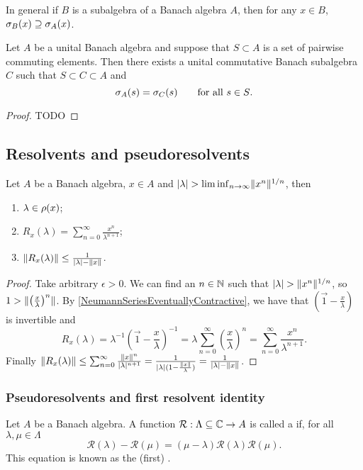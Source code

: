 In general if $B$ is a subalgebra of a Banach algebra $A$, then for any $x\in B$, $\sigma_B(x) \supseteq \sigma_A(x)$.

\begin{proposition}
Let $A$ be a unital Banach algebra and suppose that $S\subset A$ is a set of pairwise commuting elements. Then there exists a unital commutative Banach subalgebra $C$ such that $S\subset C\subset A$ and
\[ \sigma_A(s) = \sigma_C(s) \qquad \text{for all $s\in S$.} \]
\end{proposition}
\begin{proof}
TODO
\end{proof}


\subsection{Resolvents and pseudoresolvents}

\begin{proposition} \label{secondNeumannSeries}
Let $A$ be a Banach algebra, $x\in A$ and $|\lambda| > \liminf_{n\to \infty}\lVert x^n\rVert^{1/n}$, then
\begin{enumerate}
\item $\lambda\in\rho(x)$;
\item $R_x(\lambda) = \sum_{n=0}^\infty\frac{x^n}{\lambda^{n+1}}$;
\item $\lVert R_x(\lambda)\rVert \leq \frac{1}{|\lambda|-\lVert x\rVert}$.
\end{enumerate}
\end{proposition}
\begin{proof}
Take arbitrary $\epsilon > 0$. We can find an $n\in\mathbb{N}$ such that $|\lambda| > \lVert x^n\rVert^{1/n}$, so $1 > \lVert\left(\frac{x}{\lambda}\right)^n\rVert$. By \ref{NeumannSeriesEventuallyContractive}, we have that $(\vec{1} - \frac{x}{\lambda})$ is invertible and
\[ R_x(\lambda) = \lambda^{-1} \left(\vec{1} - \frac{x}{\lambda}\right)^{-1} = \lambda \sum_{n=0}^\infty\left(\frac{x}{\lambda}\right)^n = \sum_{n=0}^\infty\frac{x^n}{\lambda^{n+1}}. \]
Finally $\lVert R_x(\lambda)\rVert \leq \sum_{n=0}^\infty\frac{\lVert x\rVert^n}{|\lambda|^{n+1}} = \frac{1}{|\lambda|(1-\frac{\lVert x\rVert}{\lambda})} = \frac{1}{|\lambda|-\lVert x\rVert}$.
\end{proof}

\subsubsection{Pseudoresolvents and first resolvent identity}
\begin{definition}
Let $A$ be a Banach algebra. A function $\mathcal{R}:\Lambda \subseteq \mathbb{C} \to A$ is called a  if, for all $\lambda,\mu\in\Lambda$
\[ \mathcal{R}(\lambda) - \mathcal{R}(\mu) = (\mu-\lambda)\mathcal{R}(\lambda)\mathcal{R}(\mu). \]
This equation is known as the (first) .
\end{definition}

